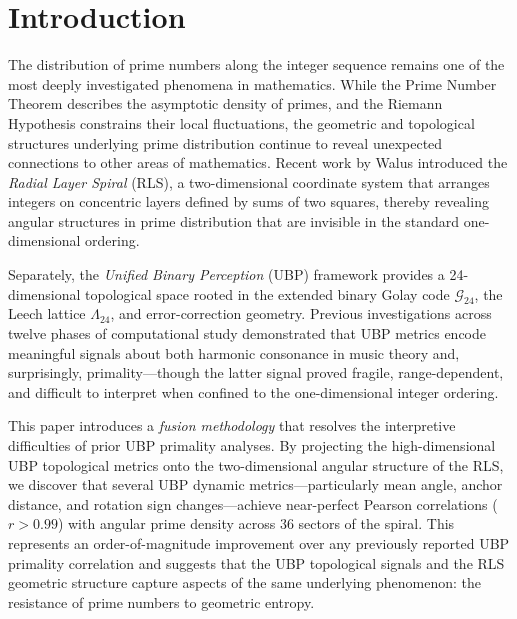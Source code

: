 \documentclass[11pt,a4paper]{article}
\theoremstyle{definition}
\begin{document}

\tableofcontents
\newpage

\section{Introduction}\label{sec:intro}

The distribution of prime numbers along the integer sequence remains one of the most deeply investigated phenomena in mathematics. While the Prime Number Theorem describes the asymptotic density of primes, and the Riemann Hypothesis constrains their local fluctuations, the geometric and topological structures underlying prime distribution continue to reveal unexpected connections to other areas of mathematics. Recent work by Walus\cite{walus2026} introduced the \emph{Radial Layer Spiral} (RLS), a two-dimensional coordinate system that arranges integers on concentric layers defined by sums of two squares, thereby revealing angular structures in prime distribution that are invisible in the standard one-dimensional ordering.

Separately, the \emph{Unified Binary Perception} (UBP) framework\cite{ubp_primes} provides a 24-dimensional topological space rooted in the extended binary Golay code $\mathcal{G}_{24}$, the Leech lattice $\Lambda_{24}$, and error-correction geometry. Previous investigations across twelve phases of computational study\cite{ubp_music} demonstrated that UBP metrics encode meaningful signals about both harmonic consonance in music theory and, surprisingly, primality---though the latter signal proved fragile, range-dependent, and difficult to interpret when confined to the one-dimensional integer ordering.

This paper introduces a \emph{fusion methodology} that resolves the interpretive difficulties of prior UBP primality analyses. By projecting the high-dimensional UBP topological metrics onto the two-dimensional angular structure of the RLS, we discover that several UBP dynamic metrics---particularly mean angle, anchor distance, and rotation sign changes---achieve near-perfect Pearson correlations ($r > 0.99$) with angular prime density across 36 sectors of the spiral. This represents an order-of-magnitude improvement over any previously reported UBP primality correlation and suggests that the UBP topological signals and the RLS geometric structure capture aspects of the same underlying phenomenon: the resistance of prime numbers to geometric entropy.
\end{document}
